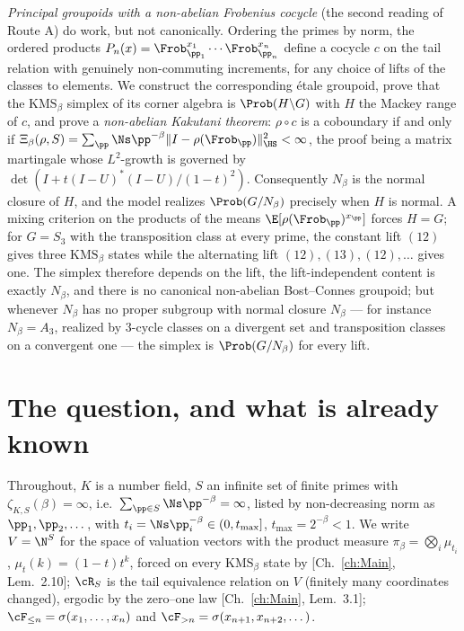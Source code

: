 \begin{summary}
\emph{Principal groupoids with a non-abelian Frobenius cocycle} (the second reading of Route
A) do work, but not canonically. Ordering the primes by norm, the ordered products
$P_n(x)=\Frob_{\pp_1}^{x_1}\cdots\Frob_{\pp_n}^{x_n}$ define a cocycle $c$ on the tail
relation with genuinely non-commuting increments, for any choice of lifts of the classes to
elements. We construct the corresponding \'etale groupoid, prove that the
$\mathrm{KMS}_\beta$ simplex of its corner algebra is $\Prob(H\backslash G)$ with $H$ the Mackey
range of $c$, and prove a \emph{non-abelian Kakutani theorem}: $\rho\circ c$ is a coboundary
if and only if $\Xi_\beta(\rho,S)=\sum_\pp\Ns\pp^{-\beta}\|I-\rho(\Frob_\pp)\|_{\HS}^2<\infty$,
the proof being a matrix martingale whose $L^2$-growth is governed by
$\det(I+t(I-U)^*(I-U)/(1-t)^2)$. Consequently $N_\beta$ is the normal closure of $H$, and
the model realizes $\Prob(G/N_\beta)$ precisely when $H$ is normal. A mixing criterion on the
products of the means $\E[\rho(\Frob_\pp)^{x_\pp}]$ forces $H=G$; for $G=S_3$ with the
transposition class at every prime, the constant lift $(12)$ gives three
$\mathrm{KMS}_\beta$ states while the alternating lift $(12),(13),(12),\dots$ gives one. The
simplex therefore depends on the lift, the lift-independent content is exactly $N_\beta$,
and there is no canonical non-abelian Bost--Connes groupoid; but whenever $N_\beta$ has no
proper subgroup with normal closure $N_\beta$ --- for instance $N_\beta=A_3$, realized by
$3$-cycle classes on a divergent set and transposition classes on a convergent one --- the
simplex is $\Prob(G/N_\beta)$ for every lift.
\end{summary}

\section{The question, and what is already known}

Throughout, $K$ is a number field, $S$ an infinite set of finite primes with
$\zeta_{K,S}(\beta)=\infty$, i.e.\ $\sum_{\pp\in S}\Ns\pp^{-\beta}=\infty$, listed by
non-decreasing norm as $\pp_1,\pp_2,\dots$, with $t_i=\Ns\pp_i^{-\beta}\in(0,t_{\max}]$,
$t_{\max}=2^{-\beta}<1$. We write
$V=\N^S$ for the space of valuation vectors with the product measure
$\pi_\beta=\bigotimes_i\mu_{t_i}$, $\mu_t(k)=(1-t)t^k$, forced on every $\mathrm{KMS}_\beta$
state by [Ch.~\ref{ch:Main}, Lem.~2.10]; $\cR_S$ is the tail equivalence relation on $V$ (finitely
many coordinates changed), ergodic by the zero--one law [Ch.~\ref{ch:Main}, Lem.~3.1];
$\cF_{\le n}=\sigma(x_1,\dots,x_n)$ and $\cF_{>n}=\sigma(x_{n+1},x_{n+2},\dots)$.

